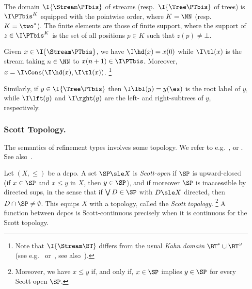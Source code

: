 \begin{example}
\label{ex:scott:stream-tree}
The domain $\I{\Stream\PTbis}$
of streams 
(resp.\ $\I{\Tree\PTbis}$ of trees)
is $\I\PTbis^K$ equipped with the pointwise order,
where $K = \NN$ (resp.\ $K = \two^*$).
The finite elements are those of finite support,
where the support of $z \in \I\PTbis^K$ is the set of all positions $p \in K$
such that $z(p) \neq \bot$.

Given $x \in \I{\Stream\PTbis}$,
we have $\I\hd(x) = x(0)$
while $\I\tl(x)$ is the stream taking $n \in \NN$ to $x(n+1) \in \I\PTbis$.
Moreover, $x = \I\Cons(\I\hd(x),\I\tl(x))$.%
\footnote{Note that $\I{\Stream\BT}$ differs from the usual \emph{Kahn domain}
$\BT^* \cup \BT^\omega$
(see e.g.~\cite[Definition 3.7.5 and Example 5.4.4]{vickers89book}
or~\cite[\S 7.4]{dst19book}, see also~\cite{vvk05concur}).}

Similarly, if $y \in \I{\Tree\PTbis}$
then $\I\lbl(y) = y(\es)$ is the root label of $y$,
while $\I\lft(y)$ and $\I\rght(y)$ are the left- and right-subtrees
of $y$, respectively.
\end{example}

\subsubsection{Scott Topology.}
\label{sec:top}
The semantics of refinement types involves some topology.
We refer to e.g.\ \cite[\S 1.2]{ac98book},
\cite[\S 2.3]{aj95chapter} or \cite[\S 7.1]{gg24book}.
See also~\cite{rs24jfla}.

Let $(X,\leq)$ be a dcpo.
%
A set $\SP \sle X$ is \emph{Scott-open}
if $\SP$ is upward-closed
(if $x \in \SP$ and $x \leq y$ in $X$, then $y \in \SP$),
and if moreover $\SP$ is inaccessible by directed sups,
in the sense that if $\bigvee D \in \SP$
with $D \sle X$ directed, then $D \cap \SP \neq \emptyset$.
This equips $X$ with a topology, called the \emph{Scott topology}.%
\footnote{Moreover, we have $x \leq y$ if, and only if,
$x \in \SP$ implies $y \in \SP$ for every Scott-open $\SP$.}
A function between dcpos is Scott-continuous
precisely when it is continuous for the Scott topology.

